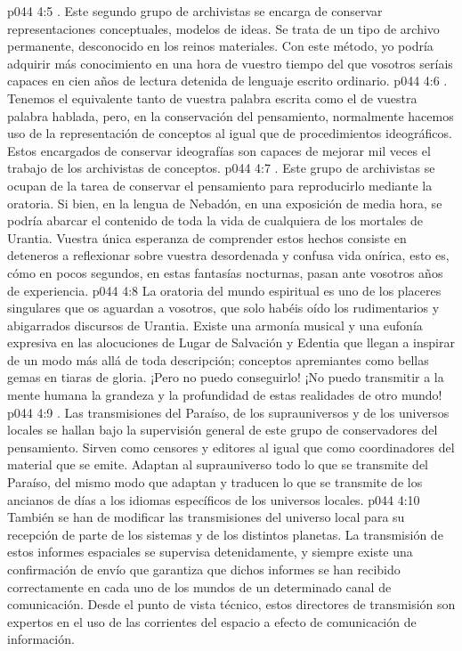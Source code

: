 \vs p044 4:5 . Este segundo grupo de archivistas se encarga de conservar representaciones conceptuales, modelos de ideas. Se trata de un tipo de archivo permanente, desconocido en los reinos materiales. Con este método, yo podría adquirir más conocimiento en una hora de vuestro tiempo del que vosotros seríais capaces en cien años de lectura detenida de lenguaje escrito ordinario.
\vs p044 4:6 . Tenemos el equivalente tanto de vuestra palabra escrita como el de vuestra palabra hablada, pero, en la conservación del pensamiento, normalmente hacemos uso de la representación de conceptos al igual que de procedimientos ideográficos. Estos encargados de conservar ideografías son capaces de mejorar mil veces el trabajo de los archivistas de conceptos.
\vs p044 4:7 . Este grupo de archivistas se ocupan de la tarea de conservar el pensamiento para reproducirlo mediante la oratoria. Si bien, en la lengua de Nebadón, en una exposición de media hora, se podría abarcar el contenido de toda la vida de cualquiera de los mortales de Urantia. Vuestra única esperanza de comprender estos hechos consiste en deteneros a reflexionar sobre vuestra desordenada y confusa vida onírica, esto es, cómo en pocos segundos, en estas fantasías nocturnas, pasan ante vosotros años de experiencia.
\vs p044 4:8 La oratoria del mundo espiritual es uno de los placeres singulares que os aguardan a vosotros, que solo habéis oído los rudimentarios y abigarrados discursos de Urantia. Existe una armonía musical y una eufonía expresiva en las alocuciones de Lugar de Salvación y Edentia que llegan a inspirar de un modo más allá de toda descripción; conceptos apremiantes como bellas gemas en tiaras de gloria. ¡Pero no puedo conseguirlo! ¡No puedo transmitir a la mente humana la grandeza y la profundidad de estas realidades de otro mundo!
\vs p044 4:9 . Las transmisiones del Paraíso, de los suprauniversos y de los universos locales se hallan bajo la supervisión general de este grupo de conservadores del pensamiento. Sirven como censores y editores al igual que como coordinadores del material que se emite. Adaptan al suprauniverso todo lo que se transmite del Paraíso, del mismo modo que adaptan y traducen lo que se transmite de los ancianos de días a los idiomas específicos de los universos locales.
\vs p044 4:10 También se han de modificar las transmisiones del universo local para su recepción de parte de los sistemas y de los distintos planetas. La transmisión de estos informes espaciales se supervisa detenidamente, y siempre existe una confirmación de envío que garantiza que dichos informes se han recibido correctamente en cada uno de los mundos de un determinado canal de comunicación. Desde el punto de vista técnico, estos directores de transmisión son expertos en el uso de las corrientes del espacio a efecto de comunicación de información.

